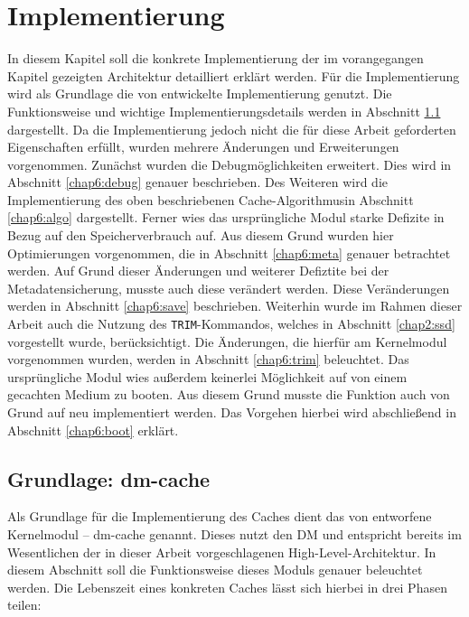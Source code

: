 \chapter{Implementierung}
\label{chap6}

In diesem Kapitel soll die konkrete Implementierung der im vorangegangen Kapitel gezeigten Architektur detailliert erklärt werden. Für die Implementierung wird
als Grundlage die von \textcite{dm-cache} entwickelte Implementierung genutzt. Die Funktionsweise und wichtige Implementierungsdetails werden in Abschnitt
\ref{chap6:dm-cache} dargestellt. Da die Implementierung jedoch nicht die für diese Arbeit geforderten Eigenschaften erfüllt, wurden mehrere Änderungen und
Erweiterungen vorgenommen. Zunächst wurden die Debugmöglichkeiten erweitert. Dies wird in Abschnitt \ref{chap6:debug} genauer beschrieben. Des Weiteren wird die
Implementierung des oben beschriebenen Cache-Algorithmusin Abschnitt \ref{chap6:algo} dargestellt. Ferner wies das ursprüngliche Modul starke Defizite in Bezug
auf den Speicherverbrauch auf. Aus diesem Grund wurden hier Optimierungen vorgenommen, die in Abschnitt \ref{chap6:meta} genauer betrachtet werden. Auf Grund
dieser Änderungen und weiterer Defiztite bei der Metadatensicherung, musste auch diese verändert werden. Diese Veränderungen werden in Abschnitt
\ref{chap6:save} beschrieben. Weiterhin wurde im Rahmen dieser Arbeit auch die Nutzung des \texttt{TRIM}-Kommandos, welches in Abschnitt \ref{chap2:ssd}
vorgestellt wurde, berücksichtigt. Die Änderungen, die hierfür am Kernelmodul vorgenommen wurden, werden in Abschnitt \ref{chap6:trim} beleuchtet. Das
ursprüngliche Modul wies außerdem keinerlei Möglichkeit auf von einem gecachten Medium zu booten. Aus diesem Grund musste die Funktion auch von Grund auf neu
implementiert werden. Das Vorgehen hierbei wird abschließend in Abschnitt \ref{chap6:boot} erklärt.

\section{Grundlage: dm-cache}
\label{chap6:dm-cache}

Als Grundlage für die Implementierung des Caches dient das von \citeauthor{dm-cache} entworfene Kernelmodul -- dm-cache genannt. Dieses nutzt den
\ac{DM} und entspricht bereits im Wesentlichen der in dieser Arbeit vorgeschlagenen High-Level-Architektur. In diesem Abschnitt soll die Funktionsweise dieses
Moduls genauer beleuchtet werden. Die Lebenszeit eines konkreten Caches lässt sich hierbei in drei Phasen teilen:

